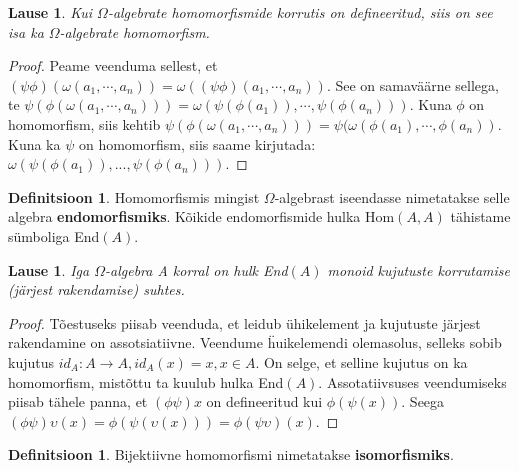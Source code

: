 \documentclass[12pt]{report}
\numberwithin{equation}{section}
\theoremstyle{definition}
\newtheorem{emorf}[equation]{Definitsioon}
\newtheorem{isomorfism}[equation]{Definitsioon}
\theoremstyle{plain}
\newtheorem{homomorfismide_korrutis_homomorfism}[equation]{Lause}
\newtheorem{emorf_on_monoid}[equation]{Lause}
\begin{document}
\begin{homomorfismide_korrutis_homomorfism}
Kui $\Omega$-algebrate homomorfismide korrutis on defineeritud, siis on see isa ka $\Omega$-algebrate homomorfism. 
\end{homomorfismide_korrutis_homomorfism}

\begin{proof}

  Peame veenduma sellest, et $(\psi\phi)(\omega(a_1,\cdots, a_n)) = \omega((\psi \phi)(a_1,\cdots,a_n))$. See on samaväärne sellega, te $\psi(\phi(\omega(a_1,\cdots,a_n))) = \omega(\psi(\phi(a_1)),\cdots, \psi(\phi(a_n)))$. Kuna $\phi$ on homomorfism, siis kehtib $ \psi(\phi(\omega(a_1,\cdots,a_n))) = \psi(\omega(\phi(a_1),\cdots,\phi(a_n))$. Kuna ka $\psi$ on homomorfism, siis saame kirjutada: $\omega(\psi(\phi(a_1)),...,\psi(\phi(a_n)))$.
  

\end{proof}


\begin{emorf}
Homomorfismis mingist $\Omega$-algebrast iseendasse nimetatakse selle algebra \textbf{endomorfismiks}. Kõikide endomorfismide hulka Hom$(A,A)$ tähistame s\"umboliga End$(A)$.
\end{emorf}
 
\begin{emorf_on_monoid}
Iga $\Omega$-algebra A korral on hulk End$(A)$ monoid kujutuste korrutamise (järjest rakendamise) suhtes. 
\end{emorf_on_monoid}

\begin{proof}
Tõestuseks piisab veenduda, et leidub \"uhikelement ja kujutuste järjest rakendamine on assotsiatiivne. Veendume \"huikelemendi olemasolus, selleks sobib kujutus $id_A : A \to A, id_{A}(x) = x, x \in A$. On selge, et selline kujutus on ka homomorfism, mistõttu ta kuulub hulka End$(A)$. Assotatiivsuses veendumiseks piisab tähele panna, et $\left( \phi\psi \right) x$ on defineeritud kui $\phi \left( \psi \left( x \right) \right)$. Seega $\left( \phi \psi \right) \upsilon \left( x \right) = \phi \left( \psi \left( \upsilon \left( x \right) \right) \right) =   \phi \left( \psi \upsilon \right) \left( x \right)$.
\end{proof}

\begin{isomorfism}
Bijektiivne homomorfismi nimetatakse \textbf{isomorfismiks}. 
\end{isomorfism}
\end{document}

